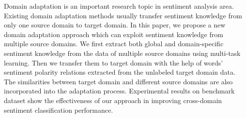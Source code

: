 Domain adaptation is an important research topic in sentiment analysis area. Existing domain adaptation methods usually transfer sentiment knowledge from only one source domain to target domain. In this paper, we propose a new domain adaptation approach which can exploit sentiment knowledge from multiple source domains. We first extract both global and domain-specific sentiment knowledge from the data of multiple source domains using multi-task learning. Then we transfer them to target domain with the help of words' sentiment polarity relations extracted from the unlabeled target domain data. The similarities between target domain and different source domains are also incorporated into the adaptation process. Experimental results on benchmark dataset show the effectiveness of our approach in improving cross-domain sentiment classification performance.
